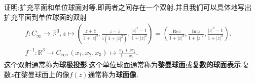 \documentclass[../../main.tex]{subfiles}%
\begin{document}
\begin{theorem}\label{theorem:扩充复平面与单位球面对等}
证明:扩充平面和单位球面对等,即两者之间存在一个双射.并且我们可以具体地写出扩充平面到单位球面的双射
\begin{gather*}
f:C_{\infty}\longrightarrow \mathbb{R} ^3,
z\longmapsto \left( \frac{z+\bar{z}}{1+|z|^2},\frac{z-\bar{z}}{\mathrm{i}\left( 1+|z|^2 \right)},\frac{|z|^2-1}{1+|z|^2} \right) =\left( \frac{\mathrm{Re}z}{1+|z|^2},\frac{\mathrm{Im}z}{1+|z|^2},\frac{|z|^2-1}{1+|z|^2} \right) .
\\
f^{-1}:\mathbb{R} ^3\longrightarrow C_{\infty},
\left( x_1,x_2,x_3 \right) \longmapsto \frac{x_1+\mathrm{i}x_2}{1-x_3}.
\end{gather*}
这个双射通常称为\textbf{球极投影}.这个单位球面通常称为\textbf{黎曼球面}或\textbf{复数的球面表示}.复数$z$在黎曼球面上的像$f(z)$通常称为\textbf{球面像}.
\end{theorem}
\end{document}

